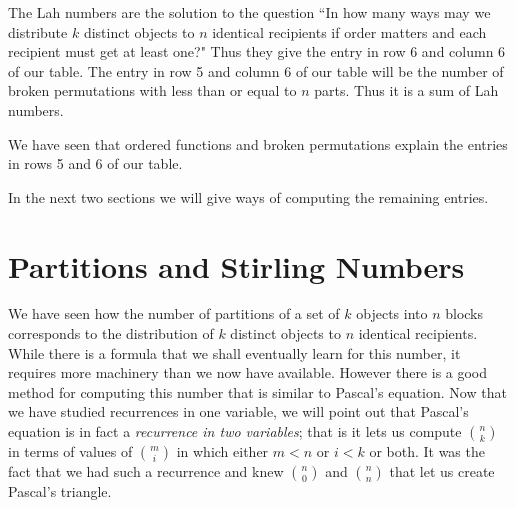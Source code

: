 \documentclass[10pt,]{book}
\theoremstyle{plain}
\theoremstyle{definition}
\numberwithin{equation}{chapter}
\newcommand{\lt}{<}
\begin{document}
\par
The Lah numbers are the solution to the question ``In how many ways may we distribute \(k\) distinct objects to \(n\) identical recipients if order matters and each recipient must get at least one?" Thus they give the entry in row 6 and column 6 of our table. The entry in row 5 and column 6 of our table will be the number of broken permutations with less than or equal to \(n\) parts. Thus it is a sum of Lah numbers.%
\par
We have seen that ordered functions and broken permutations explain the entries in rows 5 and 6 of our table.%
\par
In the next two sections we will give ways of computing the remaining entries.%
\typeout{************************************************}
\typeout{************************************************}
\section[{Partitions and Stirling Numbers}]{Partitions and Stirling Numbers}\label{section-10}
We have seen how the number of partitions of a set of \(k\) objects into \(n\) blocks corresponds to the distribution of \(k\) distinct objects to \(n\) identical recipients. While there is a formula that we shall eventually learn for this number, it requires more machinery than we now have available. However there is a good method for computing this number that is similar to Pascal's equation. Now that we have studied recurrences in one variable, we will point out that Pascal's equation is in fact a \emph{recurrence in two variables}; that is it lets us compute \(\binom{n}{k}\) in terms of values of \(\binom{m}{i}\) in which either \(m\lt n\) or \(i\lt k\) or both. It was the fact that we had such a recurrence and knew \(\binom{n}{0}\) and \(\binom{n}{n}\) that let us create Pascal's triangle.%
\typeout{************************************************}
\typeout{************************************************}
\end{document}
